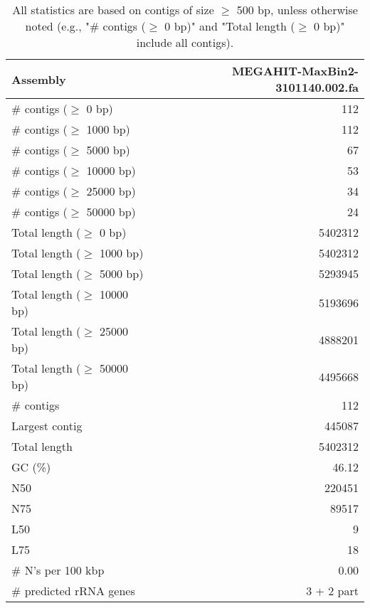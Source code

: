 \documentclass[12pt,a4paper]{article}
\begin{document}
\begin{table}[ht]
\begin{center}
\caption{All statistics are based on contigs of size $\geq$ 500 bp, unless otherwise noted (e.g., "\# contigs ($\geq$ 0 bp)" and "Total length ($\geq$ 0 bp)" include all contigs).}
\begin{tabular}{|l*{1}{|r}|}
\hline
Assembly & MEGAHIT-MaxBin2-3101140.002.fa \\ \hline
\# contigs ($\geq$ 0 bp) & 112 \\ \hline
\# contigs ($\geq$ 1000 bp) & 112 \\ \hline
\# contigs ($\geq$ 5000 bp) & 67 \\ \hline
\# contigs ($\geq$ 10000 bp) & 53 \\ \hline
\# contigs ($\geq$ 25000 bp) & 34 \\ \hline
\# contigs ($\geq$ 50000 bp) & 24 \\ \hline
Total length ($\geq$ 0 bp) & 5402312 \\ \hline
Total length ($\geq$ 1000 bp) & 5402312 \\ \hline
Total length ($\geq$ 5000 bp) & 5293945 \\ \hline
Total length ($\geq$ 10000 bp) & 5193696 \\ \hline
Total length ($\geq$ 25000 bp) & 4888201 \\ \hline
Total length ($\geq$ 50000 bp) & 4495668 \\ \hline
\# contigs & 112 \\ \hline
Largest contig & 445087 \\ \hline
Total length & 5402312 \\ \hline
GC (\%) & 46.12 \\ \hline
N50 & 220451 \\ \hline
N75 & 89517 \\ \hline
L50 & 9 \\ \hline
L75 & 18 \\ \hline
\# N's per 100 kbp & 0.00 \\ \hline
\# predicted rRNA genes & 3 + 2 part \\ \hline
\end{tabular}
\end{center}
\end{table}
\end{document}
